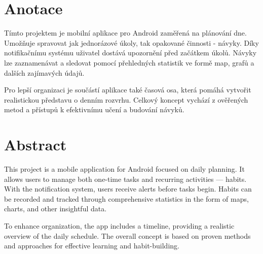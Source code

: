 \thispagestyle{empty} %

\section*{Anotace} 
\hspace{14pt} Tímto projektem je mobilní aplikace pro Android zaměřená na plánování dne. Umožňuje spravovat jak jednorázové úkoly, tak opakované činnosti - návyky. Díky notifikačnímu systému uživatel dostává upozornění před začátkem úkolů. Návyky lze zaznamenávat a sledovat pomocí přehledných statistik ve formě map, grafů a dalších zajímavých údajů.

Pro lepší organizaci je součástí aplikace také časová osa, která pomáhá vytvořit realistickou představu o denním rozvrhu. Celkový koncept vychází z ověřených metod a přístupů k efektivnímu učení a budování návyků.

\section*{Abstract} 
\hspace{14pt} This project is a mobile application for Android focused on daily planning. It allows users to manage both one-time tasks and recurring activities — habits. With the notification system, users receive alerts before tasks begin. Habits can be recorded and tracked through comprehensive statistics in the form of maps, charts, and other insightful data.  

To enhance organization, the app includes a timeline, providing a realistic overview of the daily schedule. The overall concept is based on proven methods and approaches for effective learning and habit-building.